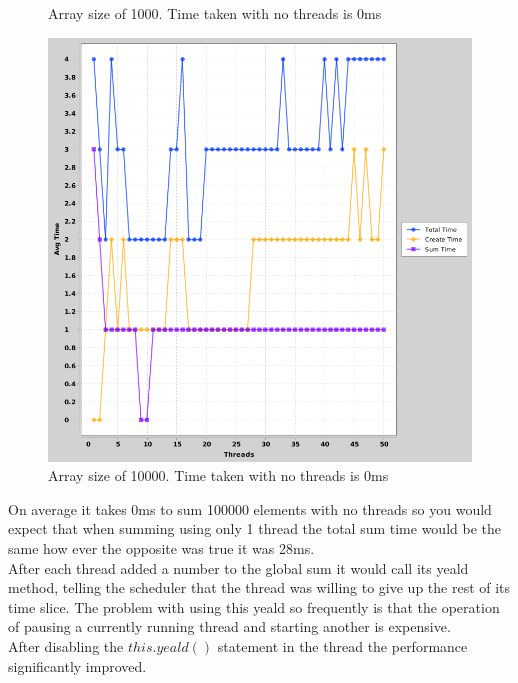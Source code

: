 \documentclass[a4paper, 12pt]{article}
\begin{document}
\begin{figure}[H]
  \caption{Array size of 1000. Time taken with no threads is 0ms}
\endminipage\hfill
{}%
  \includegraphics[width=\linewidth]{threads-vs-time-10000-global.png}
  \caption{Array size of 10000. Time taken with no threads is 0ms}
\endminipage
		\end{figure}
		
		\newpage
		
		On average it takes 0ms to sum 100000 elements with no threads so you would expect that when summing using only 1 thread the total sum time would be the same how ever the opposite was true it was 28ms.\\
		
		After each thread added a number to the global sum it would call its yeald method, telling the scheduler that the thread was willing to give up the rest of its time slice. The problem with using this yeald so frequently is that the operation of pausing a currently running thread and starting another is expensive.\\	
		
		After disabling the $this.yeald()$ statement in the thread the performance significantly improved.
		
\end{document}
